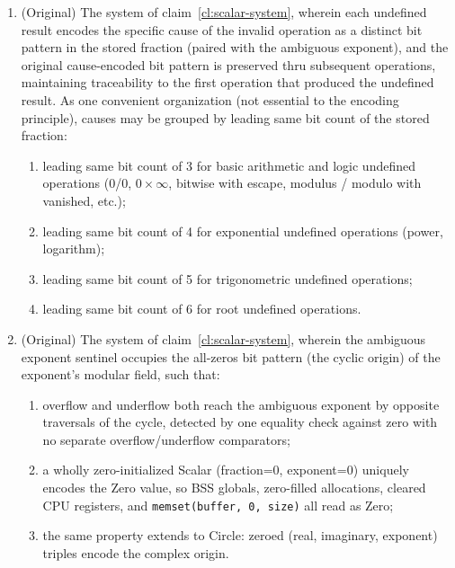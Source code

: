 \documentclass[12pt,letter]{article}
\begin{document}
\begin{enumerate}
    \item (Original) The system of claim~\ref{cl:scalar-system}, wherein each undefined result encodes the specific cause of the invalid operation as a distinct bit pattern in the stored fraction (paired with the ambiguous exponent), and the original cause-encoded bit pattern is preserved thru subsequent operations, maintaining traceability to the first operation that produced the undefined result. As one convenient organization (not essential to the encoding principle), causes may be grouped by leading same bit count of the stored fraction:
          \begin{enumerate}
              \item leading same bit count of 3 for basic arithmetic and logic undefined operations (0/0, $0 \times \infty$, bitwise with escape, modulus / modulo with vanished, etc.);
              \item leading same bit count of 4 for exponential undefined operations (power, logarithm);
              \item leading same bit count of 5 for trigonometric undefined operations;
              \item leading same bit count of 6 for root undefined operations.
          \end{enumerate}

    \item (Original) The system of claim~\ref{cl:scalar-system}, wherein the ambiguous exponent sentinel occupies the all-zeros bit pattern (the cyclic origin) of the exponent's modular field, such that:
          \begin{enumerate}
              \item overflow and underflow both reach the ambiguous exponent by opposite traversals of the cycle, detected by one equality check against zero with no separate overflow/underflow comparators;
              \item a wholly zero-initialized Scalar (fraction=0, exponent=0) uniquely encodes the Zero value, so BSS globals, zero-filled allocations, cleared CPU registers, and \texttt{memset(buffer, 0, size)} all read as Zero;
              \item the same property extends to Circle: zeroed (real, imaginary, exponent) triples encode the complex origin.
          \end{enumerate}


\end{enumerate}
\end{document}
